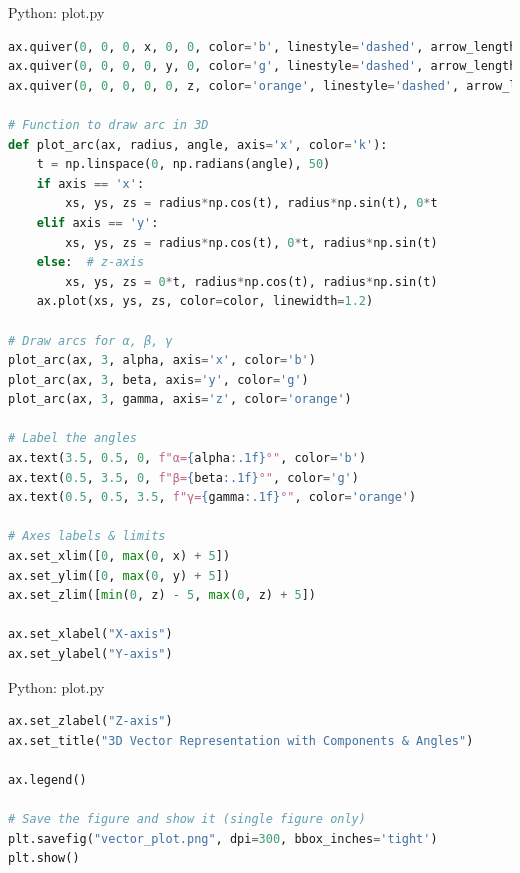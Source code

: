 \documentclass{beamer}
\numberwithin{equation}{section}
\theoremstyle{remark}
\begin{document}
\begin{frame}[fragile]{Python: plot.py}
\begin{lstlisting}[language=Python]
ax.quiver(0, 0, 0, x, 0, 0, color='b', linestyle='dashed', arrow_length_ratio=0.05, label="x-component")
ax.quiver(0, 0, 0, 0, y, 0, color='g', linestyle='dashed', arrow_length_ratio=0.05, label="y-component")
ax.quiver(0, 0, 0, 0, 0, z, color='orange', linestyle='dashed', arrow_length_ratio=0.05, label="z-component")

# Function to draw arc in 3D
def plot_arc(ax, radius, angle, axis='x', color='k'):
    t = np.linspace(0, np.radians(angle), 50)
    if axis == 'x':
        xs, ys, zs = radius*np.cos(t), radius*np.sin(t), 0*t
    elif axis == 'y':
        xs, ys, zs = radius*np.cos(t), 0*t, radius*np.sin(t)
    else:  # z-axis
        xs, ys, zs = 0*t, radius*np.cos(t), radius*np.sin(t)
    ax.plot(xs, ys, zs, color=color, linewidth=1.2)

# Draw arcs for α, β, γ
plot_arc(ax, 3, alpha, axis='x', color='b')
plot_arc(ax, 3, beta, axis='y', color='g')
plot_arc(ax, 3, gamma, axis='z', color='orange')

# Label the angles
ax.text(3.5, 0.5, 0, f"α={alpha:.1f}°", color='b')
ax.text(0.5, 3.5, 0, f"β={beta:.1f}°", color='g')
ax.text(0.5, 0.5, 3.5, f"γ={gamma:.1f}°", color='orange')

# Axes labels & limits
ax.set_xlim([0, max(0, x) + 5])
ax.set_ylim([0, max(0, y) + 5])
ax.set_zlim([min(0, z) - 5, max(0, z) + 5])

ax.set_xlabel("X-axis")
ax.set_ylabel("Y-axis")
\end{lstlisting}
\end{frame}

\begin{frame}[fragile]{Python: plot.py}
\begin{lstlisting}[language=Python]
ax.set_zlabel("Z-axis")
ax.set_title("3D Vector Representation with Components & Angles")

ax.legend()

# Save the figure and show it (single figure only)
plt.savefig("vector_plot.png", dpi=300, bbox_inches='tight')
plt.show()
\end{lstlisting}
\end{frame}
\end{document}
